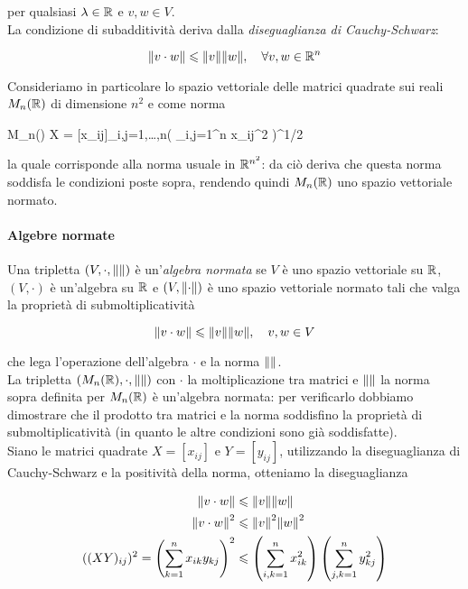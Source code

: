 per qualsiasi $ \lambda \in \mathbb{R} $ e $ v,w \in V $.\\
La condizione di subadditività deriva dalla \textit{diseguaglianza di Cauchy-Schwarz}:

\begin{equation}
	\norm{v \cdot w} \leqslant \norm{v} \norm{w} \qcomma \forall v,w \in \R^{n}
\end{equation}

Consideriamo in particolare lo spazio vettoriale delle matrici quadrate sui reali $ M_{n}(\mathbb{R}) $ di dimensione $ n^{2} $ e come norma

\map{\norm{}}
	{M_{n}(\R)}{\R}
	{X = [x_{ij}]_{i,j=1,\dots,n}}{\left( \sum_{i,j=1}^{n} x_{ij}^{2} \right)^{1/2}}
	
la quale corrisponde alla norma usuale in $ \mathbb{R}^{n^{2}} $: da ciò deriva che questa norma soddisfa le condizioni poste sopra, rendendo quindi $ M_{n}(\mathbb{R}) $ uno spazio vettoriale normato.\\

\paragraph{Algebre normate}

Una tripletta $ (V,\cdot,\norm{}) $ è un'\textit{algebra normata} se $ V $ è uno spazio vettoriale su $ \mathbb{R} $, $ (V,\cdot) $ è un'algebra su $ \mathbb{R} $ e $ (V,\norm{\cdot}) $ è uno spazio vettoriale normato tali che valga la proprietà di submoltiplicatività

\begin{equation}
	\norm{v \cdot w} \leqslant \norm{v} \norm{w} \qcomma v,w \in V
\end{equation}

che lega l'operazione dell'algebra $ \cdot $ e la norma $ \norm{} $.\\
La tripletta $ (M_{n}(\mathbb{R}),\cdot,\norm{}) $ con $ \cdot $ la moltiplicazione tra matrici e $ \norm{} $ la norma sopra definita per $ M_{n}(\mathbb{R}) $ è un'algebra normata: per verificarlo dobbiamo dimostrare che il prodotto tra matrici e la norma soddisfino la proprietà di submoltiplicatività (in quanto le altre condizioni sono già soddisfatte).\\
Siano le matrici quadrate $ X = [x_{ij}] $ e $ Y = [y_{ij}] $, utilizzando la diseguaglianza di Cauchy-Schwarz e la positività della norma, otteniamo la diseguaglianza

\begin{align}
	\norm{v \cdot w} &\leqslant \norm{v} \norm{w} \\
	\norm{v \cdot w}^{2} &\leqslant \norm{v}^{2} \norm{w}^{2} \\
	((X Y)_{ij})^{2} = \left( \sum_{k=1}^{n} x_{ik} y_{kj} \right)^{2} &\leqslant \left( \sum_{i,k=1}^{n} x_{ik}^{2} \right) \left( \sum_{j,k=1}^{n} y_{kj}^{2} \right)
\end{align}

